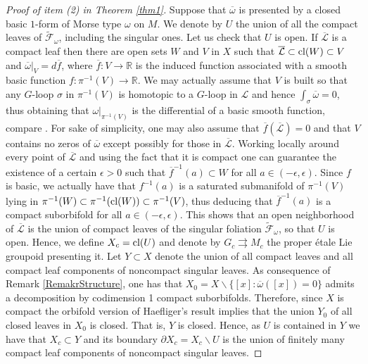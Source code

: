 \documentclass[
  a4paper, 
  reqno, 
  oneside, 
  12pt
]{amsart}
\theoremstyle{definition}
\theoremstyle{remark}
\newcommand{\rr}{\rightrightarrows}
\begin{document}
\begin{proof}[Proof of item (2) in Theorem \ref{thm1}]
Suppose that $\overline{\omega}$ is presented by a closed basic $1$-form of Morse type $\omega$ on $M$. We denote by $U$ the union of all the compact leaves of $\tilde{\mathcal{F}}_\omega$, including the singular ones. Let us check that $U$ is open. If $\overline{\mathcal{L}}$ is a compact leaf then there are open sets $W$ and $V$ in $X$ such that $\overline{\mathcal{L}}\subset \textnormal{cl}(W)\subset V$ and $\overline{\omega}|_{V}=d\overline{f}$, where $\overline{f}:V\to \mathbb{R}$ is the induced function associated with a smooth basic function $f:\pi^{-1}(V)\to \mathbb{R}$. We may actually assume that $V$ is built so that any $G$-loop $\sigma$ in $\pi^{-1}(V)$ is homotopic to a $G$-loop in $\mathcal{L}$ and hence $\int_\sigma \overline{\omega}=0$, thus obtaining that $\omega|_{\pi^{-1}(V)}$ 
is the differential of a basic smooth function, compare \cite[Prop. 3.3]{V}. For sake of simplicity, one may also assume that $\overline{f}(\overline{\mathcal{L}})=0$ and that $V$ contains no zeros of $\overline{\omega}$ except possibly for those in $\overline{\mathcal{L}}$. Working locally around every point of $\overline{\mathcal{L}}$ and using the fact that  it is compact one can guarantee the existence of a certain $\epsilon>0$ such that $\overline{f}^{-1}(a)\subset W$ for all $a\in (-\epsilon,\epsilon)$. Since $f$ is basic, we actually have that $f^{-1}(a)$ is a saturated submanifold of $\pi^{-1}(V)$ lying in $\pi^{-1}(W)\subset \pi^{-1}(\textnormal{cl}(W))\subset \pi^{-1}(V)$, thus deducing that $\overline{f}^{-1}(a)$ is a compact suborbifold for all $a\in (-\epsilon,\epsilon)$. This shows that an open neighborhood of $\overline{\mathcal{L}}$ is the union of compact leaves of the singular foliation $\tilde{\mathcal{F}}_\omega$, so that $U$ is open. Hence, we define $X_c=\textnormal{cl}(U)$ and denote by $G_c\rr M_c$ the proper étale Lie groupoid presenting it. Let $Y\subset X$ denote the union of all compact leaves and all compact leaf components of noncompact singular leaves. As consequence of Remark \ref{RemakrStructure}, one has that $X_0=X\backslash \lbrace [x]: \overline{\omega}([x])=0\rbrace$ admits a decomposition by codimension 1 compact suborbifolds. Therefore, since $X$ is compact the orbifold version of Haefliger's result \cite[Thm. 3.2]{Haefliger} implies that the union $Y_0$ of all closed leaves in $X_0$ is closed. That is, $Y$ is closed. Hence, as $U$ is contained in $Y$ we have that $X_c\subset Y$ and its boundary $\partial X_c=X_c\backslash U$ is the union of finitely many compact leaf components of noncompact singular leaves. 


\end{proof}
\end{document}
